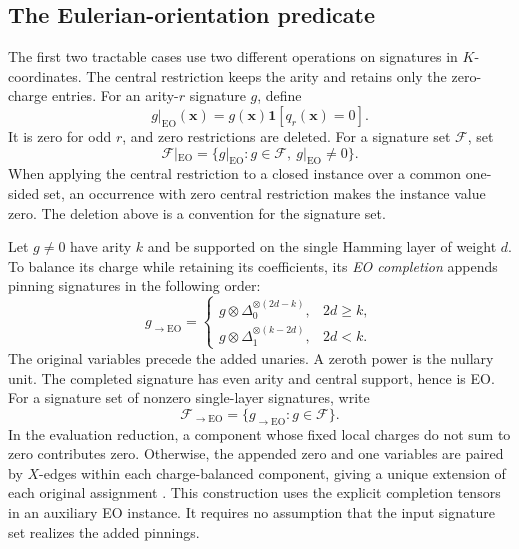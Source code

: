 \documentclass[11pt,letterpaper,onecolumn]{article}
\theoremstyle{plain}
\theoremstyle{definition}
\theoremstyle{remark}
\newcommand{\cF}{\mathcal F}
\newcommand{\EO}{\mathrm{EO}}
\newcommand{\one}{\mathbf 1}
\newcommand{\DeltaZero}{\Delta_0}
\newcommand{\DeltaOne}{\Delta_1}
\begin{document}
	
	\subsection{The Eulerian-orientation predicate}
	\label{subsec:eo-predicate}
	
	The first two tractable cases use two different operations on
	signatures in \(K\)-coordinates.  The central restriction keeps the arity
	and retains only the zero-charge entries.  For an arity-\(r\) signature
	\(g\), define
	\begin{equation*}
		g|_{\EO}({\mathbf x})=g({\mathbf x})\one[q_r({\mathbf x})=0].
	\end{equation*}
	It is zero for odd \(r\), and zero restrictions are deleted.  For a
	signature set \(\cF\), set
	\begin{equation*}
		\cF|_{\EO}=\{g|_{\EO}:g\in\cF,\ g|_{\EO}\ne0\}.
	\end{equation*}
	  When applying the
	central restriction to a closed instance over a common one-sided set,
	an occurrence with zero central restriction makes the instance value
	zero.  The deletion above is a convention for the signature set.
	
	Let \(g\ne0\) have arity \(k\) and be supported on the single Hamming
	layer of weight \(d\).  To balance its charge while retaining its
	coefficients, its \emph{EO completion} appends pinning signatures in the
	following order:
	\begin{equation}
		g_{\to\EO}
		=
		\begin{cases}
			g\otimes\DeltaZero^{\otimes(2d-k)},
			& 2d\ge k,\\
			g\otimes\DeltaOne^{\otimes(k-2d)},
			& 2d<k.
		\end{cases}
		\label{eq:eo-completion}
	\end{equation}
	The original variables precede the added unaries. A zeroth power is the nullary
	unit.  The completed signature has even arity and central support, hence is
	EO\@.  For a signature set of nonzero single-layer signatures, write
	\begin{equation*}
		\cF_{\to\EO}=\{g_{\to\EO}:g\in\cF\}.
	\end{equation*}
  In the
evaluation reduction, a component whose fixed local charges do not sum
to zero contributes zero.  Otherwise, the appended zero and one variables are paired by
\(X\)-edges within each charge-balanced component, giving a unique
extension of each original assignment
\cite[Section~6.2, proof of Corollary~68]{MengWangXia2025EO}.  This construction uses
the explicit completion tensors in an auxiliary EO instance. It requires
no assumption that the input signature set realizes the added pinnings.
	
\end{document}
